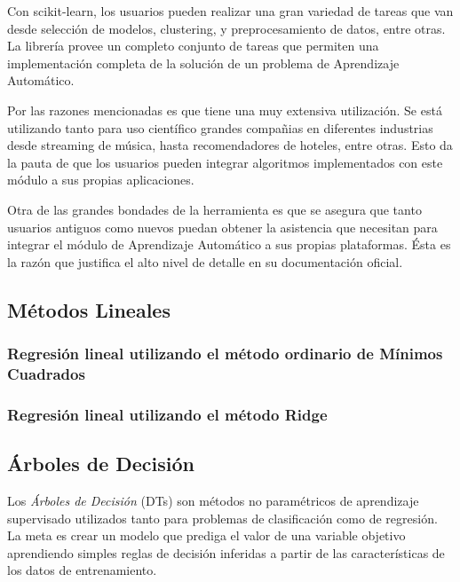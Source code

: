     \par Con scikit-learn, los usuarios pueden realizar una gran variedad de tareas
      que van desde selección de modelos, clustering, y preprocesamiento de datos, entre otras.
      La librería provee un completo conjunto de tareas que permiten una
      implementación completa de la solución de un problema de Aprendizaje Automático.

      Por las razones mencionadas es que tiene una muy extensiva utilización.
      Se está utilizando tanto para uso científico
      grandes compañias en diferentes industrias desde streaming de música, hasta
      recomendadores de hoteles, entre otras. Esto da la pauta de que los usuarios pueden
      integrar algoritmos implementados con este módulo a sus propias aplicaciones.

  Otra de las grandes bondades de la herramienta es que se asegura que tanto usuarios
  antiguos como nuevos puedan obtener la asistencia que necesitan para integrar
  el módulo de Aprendizaje Automático a sus propias plataformas. Ésta es la razón
  que justifica el alto nivel de detalle en su documentación oficial.



  \subsection{Métodos Lineales}

  \subsubsection{Regresión lineal utilizando el método ordinario de Mínimos Cuadrados}

  \subsubsection{Regresión lineal utilizando el método Ridge}


  \subsection{Árboles de Decisión}
    \par Los \textit{Árboles de Decisión} (DTs)\cite{decision_tree_regression}
      son métodos no paramétricos de aprendizaje supervisado
      utilizados tanto para problemas de clasificación como de regresión.
      La meta es crear un modelo que prediga el valor de una variable objetivo aprendiendo
      simples reglas de decisión inferidas a partir de las características de los datos
      de entrenamiento.


